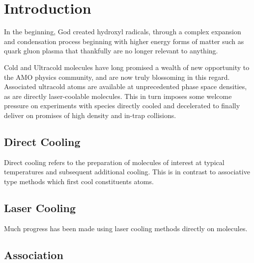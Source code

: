 \ifx\justbeingincluded\undefined

\fi

\chapter{Introduction}
\label{iii}

In the beginning, God created hydroxyl radicals, through a complex expansion and condensation process beginning with higher energy forms of matter such as quark gluon plasma that thankfully are no longer relevant to anything.

Cold and Ultracold molecules have long promised a wealth of new opportunity to the AMO physics community, and are now truly blossoming in this regard. Associated ultracold atoms are available at unprecedented phase space densities, as are directly laser-coolable molecules. This in turn imposes some welcome pressure on experiments with species directly cooled and decelerated to finally deliver on promises of high density and in-trap collisions.

\section{Direct Cooling}

Direct cooling refers to the preparation of molecules of interest at typical temperatures and subsequent additional cooling. This is in contrast to associative type methods which first cool constituents atoms.

\section{Laser Cooling}

Much progress has been made using laser cooling methods directly on molecules.

\section{Association}




\ifx\justbeingincluded\undefined

\fi

